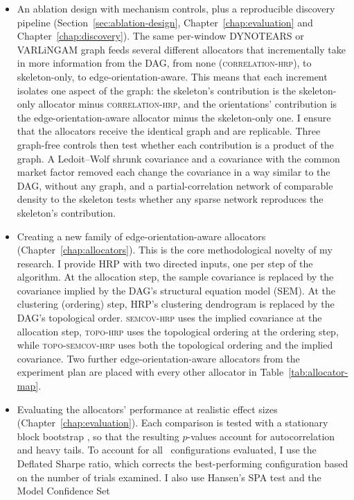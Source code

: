 \documentclass[11pt, a4paper]{report}
\newcommand{\corrhrp}{\textsc{correlation-hrp}}
\newcommand{\semcovhrp}{\textsc{semcov-hrp}}
\newcommand{\topohrp}{\textsc{topo-hrp}}
\newcommand{\toposemcovhrp}{\textsc{topo-semcov-hrp}}
\begin{document}
\begin{itemize}[itemsep=2pt, topsep=3pt]
  \item An ablation design with mechanism controls, plus a reproducible
    discovery pipeline (Section~\ref{sec:ablation-design}, Chapter~\ref{chap:evaluation} and Chapter~\ref{chap:discovery}). 
    The same per-window DYNOTEARS or VARLiNGAM graph feeds several different
    allocators that incrementally take in more information from the DAG,
    from none (\corrhrp{}), to skeleton-only, to edge-orientation-aware.
    This means that each increment isolates one aspect of the graph:
    the skeleton's contribution is the skeleton-only allocator minus \corrhrp{}, and the
    orientations' contribution is the edge-orientation-aware allocator minus the
    skeleton-only one. 
    I ensure that the allocators receive the identical graph and are replicable.
    Three graph-free controls then test whether each contribution is a product of the graph. A Ledoit--Wolf shrunk covariance and a covariance with the common market factor removed each change the covariance in a way similar to the DAG, without any graph, and a partial-correlation network of comparable density to the skeleton tests whether any sparse network reproduces the skeleton's contribution.
  \item Creating a new family of edge-orientation-aware allocators
    (Chapter~\ref{chap:allocators}). This is the core methodological novelty
    of my research. I provide HRP with two directed inputs, one per step of the
    algorithm. At the allocation step, the sample covariance is replaced by
    the covariance implied by the DAG's structural equation model (SEM).
    At the clustering (ordering) step, HRP's clustering dendrogram is replaced by
    the DAG's topological order. \semcovhrp{} uses the
    implied covariance at the allocation step, \topohrp{} uses the topological ordering at the ordering step, while
    \toposemcovhrp{} uses both the topological ordering and the implied covariance. Two further edge-orientation-aware allocators from the experiment plan are placed with every other allocator in Table~\ref{tab:allocator-map}.
  \item Evaluating the allocators' performance at realistic effect sizes (Chapter~\ref{chap:evaluation}). Each comparison is tested with
    a stationary block bootstrap \cite{politis1994stationary}, so that the
    resulting $p$-values account for autocorrelation and heavy tails.
    To account for all \rsNtrials\ configurations evaluated, I use the Deflated Sharpe
    ratio, which corrects the best-performing configuration based on the number of trials examined. I also use Hansen's SPA test and the Model Confidence Set

\end{itemize}
\end{document}
